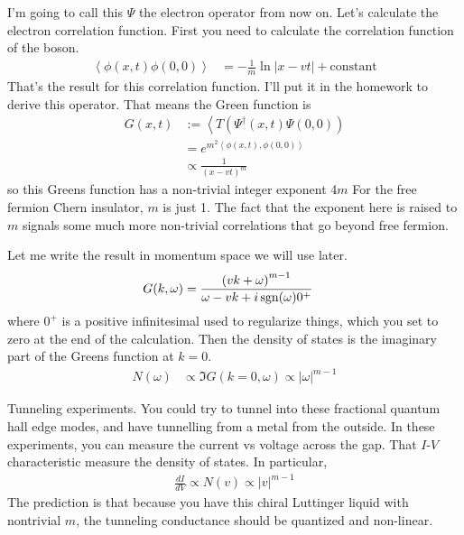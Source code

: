 I'm going to call this $\Psi$ the electron operator from now on.
Let's calculate the electron correlation function.
First you need to calculate the correlation function of the boson.
\begin{align}
    \left\langle
    \phi\left( x, t \right)
    \phi\left( 0, 0 \right)
    \right\rangle
    &=
    -\frac{1}{m}
    \ln
    \left|
    x - vt
    \right|
    +
    \text{constant}
\end{align}
That's the result for this correlation function.
I'll put it in the homework to derive this operator.
That means the Green function is
\begin{align}
    G(x, t) &:=
    \left\langle
    T\left( 
    \Psi^\dagger(x, t)
    \Psi(0, 0)
    \right)\\
    &=
    e^{m^{2}\left\langle\phi(x, t), \phi(0, 0)\right\rangle}\\
    &\propto
    \frac{1}{\left( x - vt \right)^m}
\end{align}
so this Greens function has a non-trivial integer exponent 4$m$
For the free fermion Chern insulator,
$m$ is just 1.
The fact that the exponent here is raised to $m$
signals some much more non-trivial correlations that go beyond free fermion.

Let me write the result in momentum space we will use later.
\begin{align}
    G(k, \omega) &=
    \frac{\left( vk + \omega \right)^{m-1}}{
    \omega - vk + i\operatorname{sgn}(\omega) 0^+
    }
\end{align}
where $0^+$ is a positive infinitesimal used to regularize things,
which you set to zero at the end of the calculation.
Then the density of states is the imaginary part of the Greens function at
$k=0$.
\begin{align}
    N(\omega) &\propto
    \Im G(k=0, \omega)
    \propto
    |\omega|^{m-1}
\end{align}

Tunneling experiments.
You could try to tunnel into these fractional quantum hall edge modes,
and have tunnelling from  a metal from the outside.
In these experiments,
you can measure the current vs voltage across the gap.
That $I$-$V$ characteristic measure the density of states.
In particular,
\begin{align}
    \frac{dI}{dV} \propto N(v) \propto |v|^{m-1}
\end{align}
The prediction is that because you have this chiral Luttinger liquid with
nontrivial $m$,
the tunneling conductance should be quantized and non-linear.

